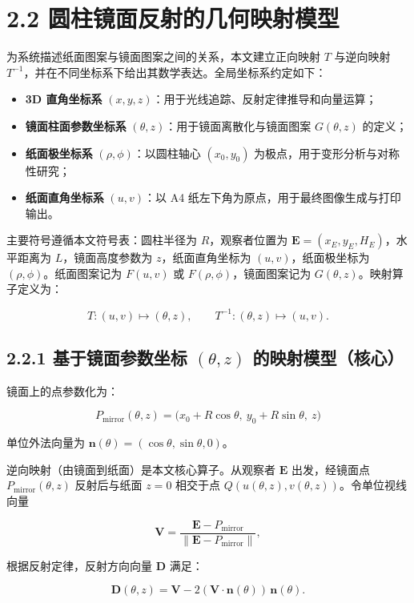 \documentclass{ctexart}
\begin{document}

\section{2.2 圆柱镜面反射的几何映射模型}

为系统描述纸面图案与镜面图案之间的关系，本文建立正向映射 $T$ 与逆向映射 $T^{-1}$，并在不同坐标系下给出其数学表达。全局坐标系约定如下：

\begin{itemize}
\item \textbf{3D 直角坐标系} $(x,y,z)$：用于光线追踪、反射定律推导和向量运算；
\item \textbf{镜面柱面参数坐标系} $(\theta,z)$：用于镜面离散化与镜面图案 $G(\theta,z)$ 的定义；
\item \textbf{纸面极坐标系} $(\rho,\phi)$：以圆柱轴心 $(x_0,y_0)$ 为极点，用于变形分析与对称性研究；
\item \textbf{纸面直角坐标系} $(u,v)$：以 A4 纸左下角为原点，用于最终图像生成与打印输出。
\end{itemize}

主要符号遵循本文符号表：圆柱半径为 $R$，观察者位置为 $\mathbf{E}=(x_E,y_E,H_E)$，水平距离为 $L$，镜面高度参数为 $z$，纸面直角坐标为 $(u,v)$，纸面极坐标为 $(\rho,\phi)$。纸面图案记为 $F(u,v)$ 或 $F(\rho,\phi)$，镜面图案记为 $G(\theta,z)$。映射算子定义为：

\[
T:(u,v)\mapsto(\theta,z),\qquad T^{-1}:(\theta,z)\mapsto(u,v).
\]

\subsection{2.2.1 基于镜面参数坐标 $(\theta,z)$ 的映射模型（核心）}

镜面上的点参数化为：

\[
P_{\text{mirror}}(\theta,z)=\bigl(x_0+R\cos\theta,\ y_0+R\sin\theta,\ z\bigr)
\]

单位外法向量为 $\mathbf{n}(\theta)=(\cos\theta,\sin\theta,0)$。

逆向映射（由镜面到纸面）是本文核心算子。从观察者 $\mathbf{E}$ 出发，经镜面点 $P_{\text{mirror}}(\theta,z)$ 反射后与纸面 $z=0$ 相交于点 $Q(u(\theta,z),v(\theta,z))$。令单位视线向量

\[
\mathbf{V}=\frac{\mathbf{E}-P_{\text{mirror}}}{\lVert\mathbf{E}-P_{\text{mirror}}\rVert},
\]

根据反射定律，反射方向向量 $\mathbf{D}$ 满足：

\[
\mathbf{D}(\theta,z)=\mathbf{V}-2(\mathbf{V}\cdot\mathbf{n}(\theta))\,\mathbf{n}(\theta).
\]
\end{document}
